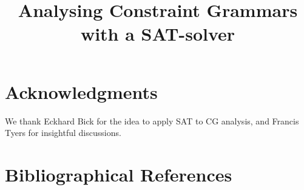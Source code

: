 \documentclass[10pt, a4paper]{article}
\title{Analysing Constraint Grammars with a SAT-solver}
\begin{document}
\maketitleabstract







\section*{Acknowledgments}
We thank Eckhard Bick for the idea to apply SAT to CG analysis, and Francis Tyers for insightful discussions.

\section{Bibliographical References}
\label{main:ref}





\end{document}
